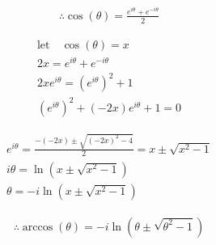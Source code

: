 \documentclass{../../style}
\begin{document}
\euler

\begin{gather*}
	\therefore \cos(\theta) = \frac{e^{i\theta} + e^{-i\theta}}{2}
\end{gather*}

\begin{gather*}
	\text{let} \quad \cos(\theta) = x \\
	2x = e^{i\theta} + e^{-i\theta} \\
	2xe^{i\theta} = (e^{i\theta})^2 + 1 \\ 
	(e^{i\theta})^2 + (-2x)e^{i\theta} + 1 = 0
\end{gather*}

\begin{gather*}
	e^{i\theta} = \frac{-(-2x) \pm \sqrt{(-2x)^2 - 4}}{2} = x \pm \sqrt{x^2 - 1} \\
	i\theta = \ln(x \pm \sqrt{x^2 - 1}) \\
	\theta = -i\ln(x \pm \sqrt{x^2 - 1})
\end{gather*}

\begin{gather*}
	\therefore \arccos(\theta) = -i\ln(\theta \pm \sqrt{\theta^2 - 1})
\end{gather*}
\end{document}
